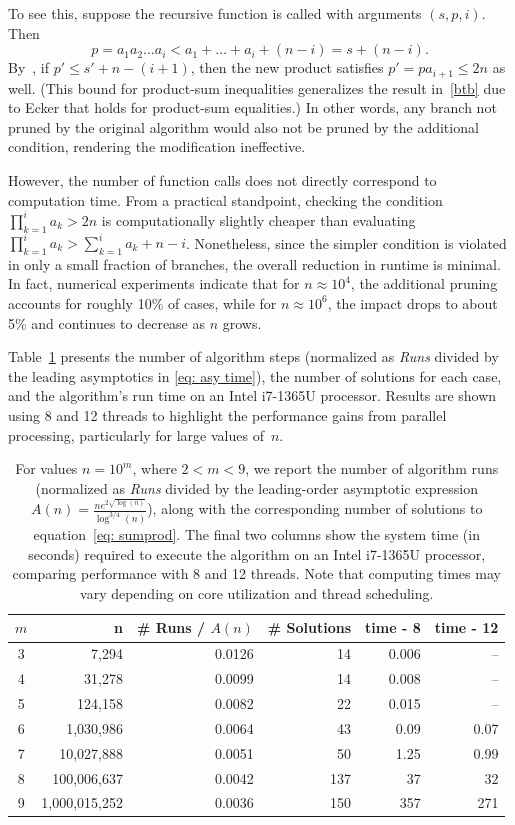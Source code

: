 \documentclass[10pt]{article}
\theoremstyle{definition}
\theoremstyle{remark}
\numberwithin{equation}{section}
\begin{document}
To see this, suppose the recursive function is called with arguments \( (s, p, i) \). Then
\[
p = a_1 a_2 \dots a_i < a_1 + \dots + a_i + (n - i) = s + (n - i).
\]
By~\cite[Lemma 6 (iii)]{weingartner}, if $p'\leq s'+n-(i+1)$, then the new product satisfies \( p'=p a_{i+1} \leq 2n \) as well. (This bound for product-sum inequalities generalizes the result in~\eqref{btb} due to Ecker that holds for product-sum equalities.) In other words, any branch not pruned by the original algorithm would also not be pruned by the additional condition, rendering the modification ineffective.

However, the number of function calls does not directly correspond to computation time. From a practical standpoint, checking the condition \( \prod_{k=1}^i a_k > 2n \) is computationally slightly cheaper than evaluating \( \prod_{k=1}^i a_k > \sum_{k=1}^i a_k + n - i \). Nonetheless, since the simpler condition is violated in only a small fraction of branches, the overall reduction in runtime is minimal. In fact, numerical experiments indicate that for \( n \approx 10^4 \), the additional pruning accounts for roughly 10\% of cases, while for \( n \approx 10^6 \), the impact drops to about 5\% and continues to decrease as \( n \) grows.

Table~\ref{tab: time comp} presents the number of algorithm steps (normalized as \emph{Runs} divided by the leading asymptotics in \eqref{eq: asy time}), the number of solutions for each case, and the algorithm's run time on an Intel i7-1365U processor. Results are shown using 8 and 12 threads to highlight the performance gains from parallel processing, particularly for large values of~$n$.
\begin{table}[h!]
\centering
\begin{tabular}{|c|r|r|r|r|r|}
\hline
\textbf{\( m \)} & \textbf{n} & \textbf{\# Runs / \( A(n) \)} & \textbf{\# Solutions} & \textbf{time - 8} & \textbf{time - 12} \\
\hline
3 & 7,294 & 0.0126 & 14 & 0.006 & -- \\
4 & 31,278 & 0.0099 & 14 & 0.008 & -- \\
5 & 124,158 & 0.0082 & 22 & 0.015 & -- \\
6 & 1,030,986 & 0.0064 & 43 & 0.09 & 0.07 \\
7 & 10,027,888 & 0.0051 & 50 & 1.25 & 0.99 \\
8 & 100,006,637 & 0.0042 & 137 & 37 & 32 \\
9 & 1,000,015,252 & 0.0036 & 150 & 357 & 271 \\
\hline
\end{tabular}
\caption{For values \( n = 10^m \), where \( 2 < m < 9 \), we report the number of algorithm runs (normalized as \emph{Runs} divided by the leading-order asymptotic expression 
\( A(n) = \frac{n e^{2\sqrt{\log(n)}}}{\log^{3/4}(n)} \)), along with the corresponding number of solutions to equation~\eqref{eq: sumprod}. 
The final two columns show the system time (in seconds) required to execute the algorithm on an Intel i7-1365U processor, comparing performance with 8 and 12 threads. 
Note that computing times may vary depending on core utilization and thread scheduling.}
\label{tab: time comp}
\end{table}
\end{document}
